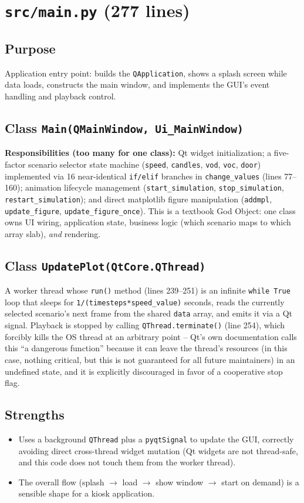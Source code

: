 \documentclass[11pt,a4paper]{report}
\begin{document}
\section{\texttt{src/main.py} (277 lines)}

\subsection{Purpose}
Application entry point: builds the \texttt{QApplication}, shows a splash screen while data loads,
constructs the main window, and implements the GUI's event handling and playback control.

\subsection{Class \texttt{Main(QMainWindow, Ui\_MainWindow)}}
\textbf{Responsibilities (too many for one class):} Qt widget initialization; a five-factor scenario
selector state machine (\texttt{speed}, \texttt{candles}, \texttt{vod}, \texttt{voc}, \texttt{door}) implemented via
16 near-identical \texttt{if/elif} branches in \texttt{change\_values} (lines 77--160); animation
lifecycle management (\texttt{start\_simulation}, \texttt{stop\_simulation}, \texttt{restart\_simulation});
and direct matplotlib figure manipulation (\texttt{addmpl}, \texttt{update\_figure},
\texttt{update\_figure\_once}). This is a textbook God Object: one class owns UI wiring, application
state, business logic (which scenario maps to which array slab), \emph{and} rendering.

\subsection{Class \texttt{UpdatePlot(QtCore.QThread)}}
A worker thread whose \texttt{run()} method (lines 239--251) is an infinite \texttt{while True} loop
that sleeps for \texttt{1/(timesteps*speed\_value)} seconds, reads the currently selected scenario's
next frame from the shared \texttt{data} array, and emits it via a Qt signal. Playback is stopped by
calling \texttt{QThread.terminate()} (line 254), which forcibly kills the OS thread at an
arbitrary point -- Qt's own documentation calls this ``a dangerous function'' because it can leave the
thread's resources (in this case, nothing critical, but this is not guaranteed for all future
maintainers) in an undefined state, and it is explicitly discouraged in favor of a cooperative
stop flag.

\subsection{Strengths}
\begin{itemize}[nosep]
\item Uses a background \texttt{QThread} plus a \texttt{pyqtSignal} to update the GUI, correctly
avoiding direct cross-thread widget mutation (Qt widgets are not thread-safe, and this code does not
touch them from the worker thread).
\item The overall flow (splash $\to$ load $\to$ show window $\to$ start on demand) is a sensible
shape for a kiosk application.
\end{itemize}
\end{document}
